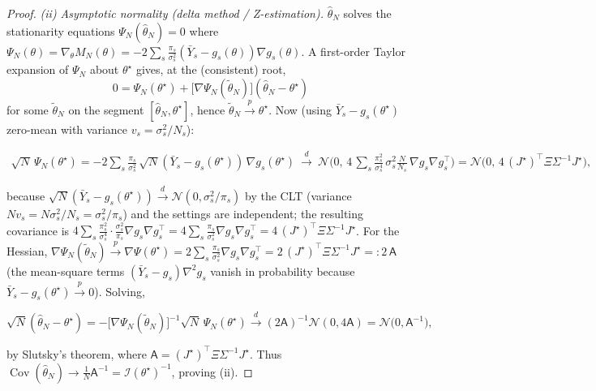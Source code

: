 \documentclass[aps,prresearch,reprint,superscriptaddress,nofootinbib,amsmath,amssymb]{revtex4-2}
\begin{document}
\begin{proof}
\emph{(ii) Asymptotic normality (delta method / Z-estimation).} $\hat\theta_N$ solves the stationarity equations $\Psi_N(\hat\theta_N)=0$ where $\Psi_N(\theta)=\nabla_\theta M_N(\theta)=-2\sum_s\tfrac{\pi_s}{\sigma_s^2}(\bar Y_s-g_s(\theta))\nabla g_s(\theta)$. A first-order Taylor expansion of $\Psi_N$ about $\theta^\star$ gives, at the (consistent) root,
\begin{equation*}
    0=\Psi_N(\theta^\star)+\bigl[\nabla\Psi_N(\tilde\theta_N)\bigr](\hat\theta_N-\theta^\star)
\end{equation*}
for some $\tilde\theta_N$ on the segment $[\hat\theta_N,\theta^\star]$, hence $\tilde\theta_N\xrightarrow{p}\theta^\star$. Now (using $\bar Y_s-g_s(\theta^\star)$ zero-mean with variance $v_s=\sigma_s^2/N_s$):
\begin{widetext}
\begin{align*}
    \sqrt N\,\Psi_N(\theta^\star)
    =-2\sum_s\frac{\pi_s}{\sigma_s^2}\,\sqrt N(\bar Y_s-g_s(\theta^\star))\,\nabla g_s(\theta^\star)
    \ \xrightarrow{\ d\ }\ \mathcal{N}\!\bigl(0,\,4\,\textstyle\sum_s\tfrac{\pi_s^2}{\sigma_s^4}\,\sigma_s^2\tfrac{N}{N_s}\,\nabla g_s\nabla g_s^\top\bigr)
    =\mathcal{N}\!\bigl(0,\,4\,(J^\star)^\top\Xi\Sigma^{-1}J^\star\bigr),
\end{align*}
\end{widetext}
because $\sqrt N(\bar Y_s-g_s(\theta^\star))\xrightarrow{d}\mathcal{N}(0,\sigma_s^2/\pi_s)$ by the CLT (variance $N v_s=N\sigma_s^2/N_s=\sigma_s^2/\pi_s$) and the settings are independent; the resulting covariance is $4\sum_s\tfrac{\pi_s^2}{\sigma_s^4}\cdot\tfrac{\sigma_s^2}{\pi_s}\nabla g_s\nabla g_s^\top=4\sum_s\tfrac{\pi_s}{\sigma_s^2}\nabla g_s\nabla g_s^\top=4\,(J^\star)^\top\Xi\Sigma^{-1}J^\star$. For the Hessian, $\nabla\Psi_N(\tilde\theta_N)\xrightarrow{p}\nabla\Psi(\theta^\star)=2\sum_s\tfrac{\pi_s}{\sigma_s^2}\nabla g_s\nabla g_s^\top=2\,(J^\star)^\top\Xi\Sigma^{-1}J^\star=:2\,\mathsf{A}$ (the mean-square terms $(\bar Y_s-g_s)\nabla^2g_s$ vanish in probability because $\bar Y_s-g_s(\theta^\star)\xrightarrow{p}0$). Solving,
\begin{widetext}
\begin{equation*}
    \sqrt N(\hat\theta_N-\theta^\star)=-\bigl[\nabla\Psi_N(\tilde\theta_N)\bigr]^{-1}\sqrt N\,\Psi_N(\theta^\star)\xrightarrow{\ d\ }(2\mathsf{A})^{-1}\mathcal{N}(0,4\mathsf{A})=\mathcal{N}\!\bigl(0,\mathsf{A}^{-1}\bigr),
\end{equation*}
\end{widetext}
by Slutsky's theorem, where $\mathsf{A}=(J^\star)^\top\Xi\Sigma^{-1}J^\star$. Thus $\operatorname{Cov}(\hat\theta_N)\to\tfrac1N\mathsf{A}^{-1}=\mathcal{I}(\theta^\star)^{-1}$, proving (ii).


\end{proof}
\end{document}
